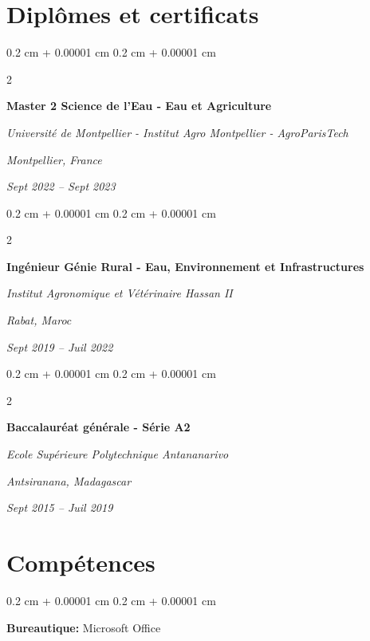 \documentclass[10pt, letterpaper]{article}
\newenvironment{onecolentry}{
  \begin{adjustwidth}{
    0.2 cm + 0.00001 cm
  }{
    0.2 cm + 0.00001 cm
  }
}{
  \end{adjustwidth}
} %
\newenvironment{twocolentry}[2][]{
  \onecolentry
  \def\secondColumn{#2}
  \setcolumnwidth{\fill, 4.9 cm}
  \begin{paracol}{2}
}{
  \switchcolumn \raggedleft \secondColumn
  \end{paracol}
  \endonecolentry
} %
\begin{document}
\vspace{0.2 cm}
  

\section{Diplômes et certificats}

  \begin{twocolentry}
    {
      \textit{Montpellier, France}

      \textit{Sept 2022 – Sept 2023}
    }
    {
      \textbf{Master 2 Science de l'Eau - Eau et Agriculture}

      \textit{Université de Montpellier - Institut Agro Montpellier - AgroParisTech}
    }
  \end{twocolentry}

  \vspace{0.1 cm}

  \begin{twocolentry}
    {
      \textit{Rabat, Maroc}

      \textit{Sept 2019 – Juil 2022}
    }
    {
      \textbf{Ingénieur Génie Rural - Eau, Environnement et Infrastructures}

      \textit{Institut Agronomique et Vétérinaire Hassan II}
    }
  \end{twocolentry}

  \vspace{0.1 cm}

  \begin{twocolentry}
    {
      \textit{Antsiranana, Madagascar}

      \textit{Sept 2015 – Juil 2019}
    }
    {
      \textbf{Baccalauréat générale - Série A2}

      \textit{Ecole Supérieure Polytechnique Antananarivo}
    }
  \end{twocolentry}

\vspace{0.2 cm}


\section{Compétences}
  \begin{onecolentry}
    \textbf{Bureautique:} Microsoft Office
  \end{onecolentry}

  \vspace{0.1 cm}
\end{document}
